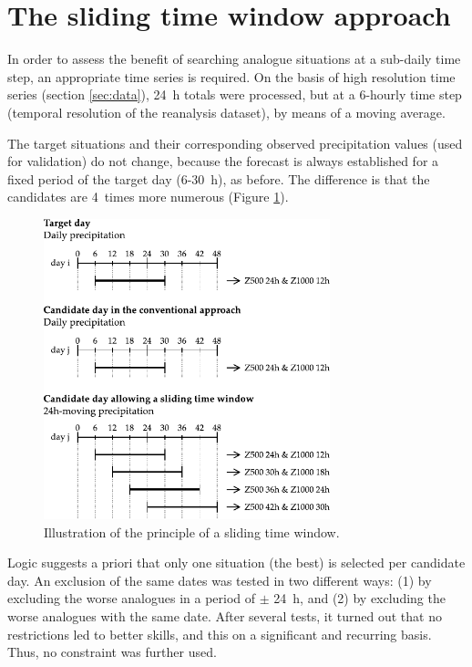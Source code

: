 \documentclass[hess]{copernicus}
\begin{document}



\section{The sliding time window approach}
\label{sec:method}

In order to assess the benefit of searching analogue situations at a sub-daily time step, an appropriate time series is required. On the basis of high resolution time series (section \ref{sec:data}), 24~h totals were processed, but at a 6-hourly time step (temporal resolution of the reanalysis dataset), by means of a moving average. 

The target situations and their corresponding observed precipitation values (used for validation) do not change, because the forecast is always established for a fixed period of the target day (6-30~h), as before. The difference is that the candidates are 4~times more numerous (Figure \ref{fig:principle}).

\begin{figure}[htb]
	\begin{center}
		\includegraphics[width=8.3cm]{figures/illustration_moving_window.pdf}
	\end{center}
	\caption{Illustration of the principle of a sliding time window. }
	\label{fig:principle}
\end{figure}

Logic suggests a priori that only one situation (the best) is selected per candidate day. An exclusion of the same dates was tested in two different ways: (1)
by excluding the worse analogues in a period of $\pm$ 24~h, and (2) by excluding the worse analogues with the same date. After several tests, it turned out that no restrictions led to better skills, and this on a significant and recurring basis. Thus, no constraint was further used.
\end{document}
